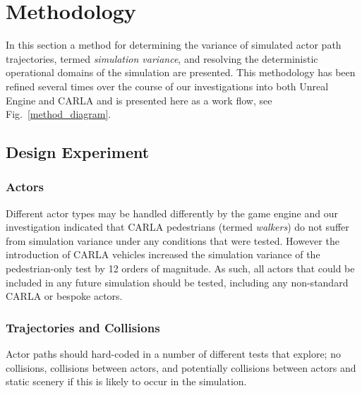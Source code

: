 \documentclass[letterpaper, 10 pt, journal, twoside]{IEEEtran}
\begin{document}
\section{Methodology} \label{s:methodology}
In this section a method for determining the variance of simulated actor path trajectories, termed \textit{simulation variance}, and resolving the deterministic operational domains of the simulation are presented. 
%
This methodology has been refined several times over the course of our investigations into both Unreal Engine and CARLA and is presented here as a work flow, see Fig.~\ref{method_diagram}. %
%
\subsection{Design Experiment}\label{s:design_experiment}

\subsubsection{Actors} \label{s:actors}

Different actor types may be handled differently by the game engine and our investigation indicated that CARLA pedestrians (termed \textit{walkers}) do not suffer from simulation variance under any conditions that were tested. However the introduction of CARLA vehicles increased the simulation variance of the pedestrian-only test by 12 orders of magnitude. As such, all actors that could be included in any future simulation should be tested, including any non-standard CARLA or bespoke actors.
%
\subsubsection{Trajectories and Collisions} 
Actor paths should hard-coded in a number of different tests that explore; no collisions, collisions between actors, and potentially collisions between actors and static scenery if this is likely to occur in the simulation.
\end{document}
